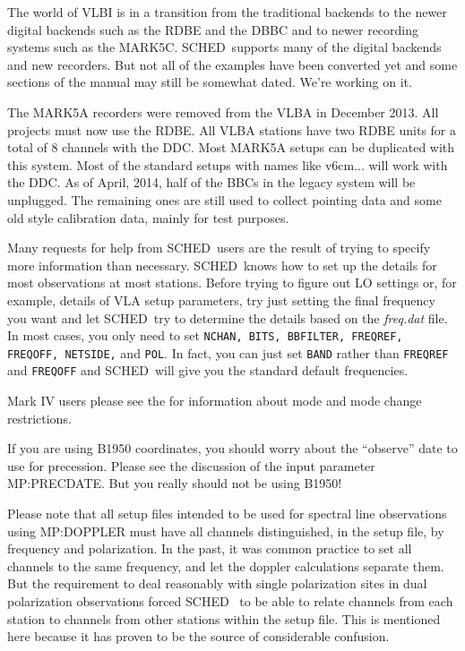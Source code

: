 \documentclass{report}
\newcommand{\schedb}{{\sc SCHED~}}
\begin{document}
\begin{list}{}{\parsep 0.5em \itemsep 0.5em }

\item The world of VLBI is in a transition from the traditional
backends to the newer digital backends such as the RDBE and the DBBC
and to newer recording systems such as the MARK5C.  \schedb supports
many of the digital backends and new recorders.  But not all of the
examples have been converted yet and some sections of the manual may
still be somewhat dated.  We're working on it.

\item The MARK5A recorders were removed from the VLBA in December
2013.  All projects must now use the RDBE.  All VLBA stations have
two RDBE units for a total of 8 channels with the DDC.  Most MARK5A
setups can be duplicated with this system.  Most of the standard 
setups with names like v6cm... will work with the DDC.  As of April,
2014, half of the BBCs in the legacy system will be unplugged.  The
remaining ones are still used to collect pointing data and some old
style calibration data, mainly for test purposes.

\item Many requests for help from \schedb users are the result of trying
to specify more information than necessary.  \schedb knows how to set up
the details for most observations at most stations.  Before trying to
figure out LO settings or, for example, details of VLA setup parameters,
try just setting the final frequency you want and let \schedb try to
determine the details based on the {\sl freq.dat} file.  In most cases,
you only need to set {\tt NCHAN, BITS, BBFILTER, FREQREF, FREQOFF,
NETSIDE,} and {\tt POL}.  In fact, you can just set {\tt BAND} rather
than {\tt FREQREF} and {\tt FREQOFF} and \schedb will give you the
standard default frequencies.

\item Mark IV users please see the 
for information about mode and mode change restrictions.

\item If you are using B1950 coordinates, you should worry
about the ``observe'' date to use for precession.  Please see the
discussion of the input parameter 
{MP:PRECDATE}.  But you really should not be using B1950!

\item Please note that all setup files intended to be used for
spectral line observations using  {MP:DOPPLER}
must have all channels distinguished, in the setup file, by frequency
and polarization.  In the past, it was common practice to set all
channels to the same frequency, and let the doppler calculations
separate them.  But the requirement to deal reasonably with single
polarization sites in dual polarization observations forced \schedb
to be able to relate channels from each station to channels from
other stations within the setup file.  This is mentioned here because
it has proven to be the source of considerable confusion.


\end{list}
\end{document}
